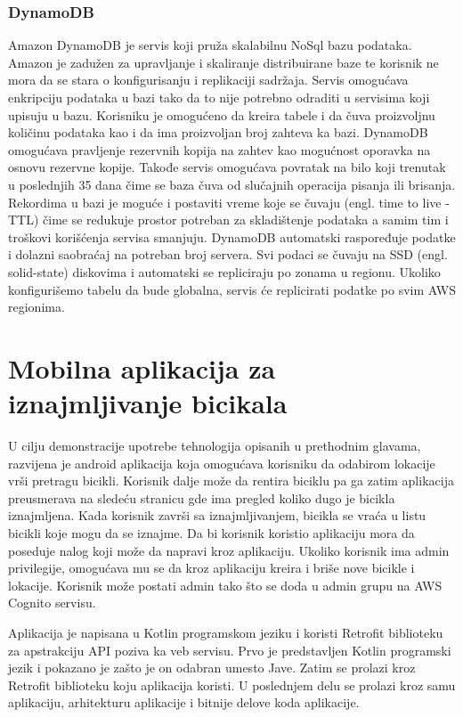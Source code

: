 \documentclass[12pt,oneside]{memoir}
\begin{document}
\subsection{DynamoDB}

Amazon DynamoDB je servis koji pruža skalabilnu NoSql bazu podataka. Amazon je zadužen za upravljanje i skaliranje distribuirane baze te korisnik ne mora da se stara o konfigurisanju i replikaciji sadržaja. Servis omogućava enkripciju podataka u bazi tako da to nije potrebno odraditi u servisima koji upisuju u bazu. Korisniku je omogućeno da kreira tabele i da čuva proizvoljnu količinu podataka kao i da ima proizvoljan broj zahteva ka bazi. DynamoDB omogućava pravljenje rezervnih kopija na zahtev kao mogućnost oporavka na osnovu rezervne kopije. Takođe servis omogućava povratak na bilo koji trenutak u poslednjih 35 dana čime se baza čuva od slučajnih operacija pisanja ili brisanja. Rekordima u bazi je moguće i postaviti vreme koje se čuvaju (engl. time to live - TTL) čime se redukuje prostor potreban za skladištenje podataka a samim tim i troškovi korišćenja servisa smanjuju. DynamoDB automatski raspoređuje podatke i dolazni saobraćaj na potreban broj servera. Svi podaci se čuvaju na SSD (engl. solid-state) diskovima i automatski se repliciraju po zonama u regionu. Ukoliko konfigurišemo tabelu da bude globalna, servis će replicirati podatke po svim AWS regionima.

\chapter{Mobilna aplikacija za iznajmljivanje bicikala}
 
U cilju demonstracije upotrebe tehnologija opisanih u prethodnim glavama, razvijena je android aplikacija koja omogućava korisniku da odabirom lokacije vrši pretragu bicikli. Korisnik dalje može da rentira biciklu pa ga zatim aplikacija preusmerava na sledeću stranicu gde ima pregled koliko dugo je bicikla iznajmljena. Kada korisnik završi sa iznajmljivanjem, bicikla se vraća u listu bicikli koje mogu da se iznajme. Da bi korisnik koristio aplikaciju mora da poseduje nalog koji može da napravi kroz aplikaciju. Ukoliko korisnik ima admin privilegije, omogućava mu se da kroz aplikaciju kreira i briše nove bicikle i lokacije. Korisnik može postati admin tako što se doda u admin grupu na AWS Cognito servisu.
 
Aplikacija je napisana u Kotlin programskom jeziku i koristi Retrofit biblioteku za apstrakciju API poziva ka veb servisu. Prvo je predstavljen Kotlin programski jezik i pokazano je zašto je on odabran umesto Jave. Zatim se prolazi kroz Retrofit biblioteku koju aplikacija koristi. U poslednjem delu se prolazi kroz samu aplikaciju, arhitekturu aplikacije i bitnije delove koda aplikacije.
\end{document}
